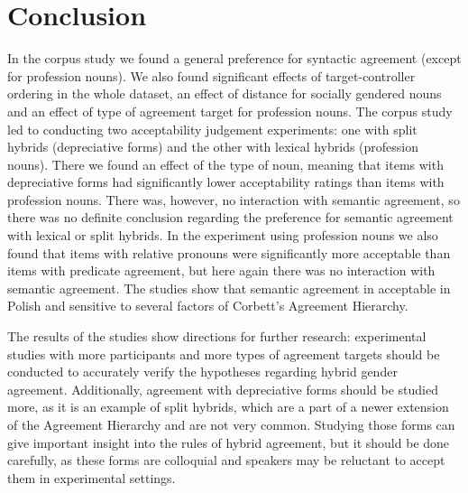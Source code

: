 \chapter*{Conclusion}\label{chap:Conclusion}

In the corpus study we found a general preference for syntactic agreement (except for profession nouns). We also found significant effects of target-controller ordering in the whole dataset, an effect of distance for socially gendered nouns and an effect of type of agreement target for profession nouns. The corpus study led to conducting two acceptability judgement experiments: one with split hybrids (depreciative forms) and the other with lexical hybrids (profession nouns). There we found an effect of the type of noun, meaning that items with depreciative forms had significantly lower acceptability ratings than items with profession nouns. There was, however, no interaction with semantic agreement, so there was no definite conclusion regarding the preference for semantic agreement with lexical or split hybrids. In the experiment using profession nouns we also found that items with relative pronouns were significantly more acceptable than items with predicate agreement, but here again there was no interaction with semantic agreement. The studies show that semantic agreement in acceptable in Polish and sensitive to several factors of Corbett’s Agreement Hierarchy.

The results of the studies show directions for further research: experimental studies with more participants and more types of agreement targets should be conducted to accurately verify the hypotheses regarding hybrid gender agreement. Additionally, agreement with depreciative forms should be studied more, as it is an example of split hybrids, which are a part of a newer extension of the Agreement Hierarchy and are not very common. Studying those forms can give important insight into the rules of hybrid agreement, but it should be done carefully, as these forms are colloquial and speakers may be reluctant to accept them in experimental settings.
